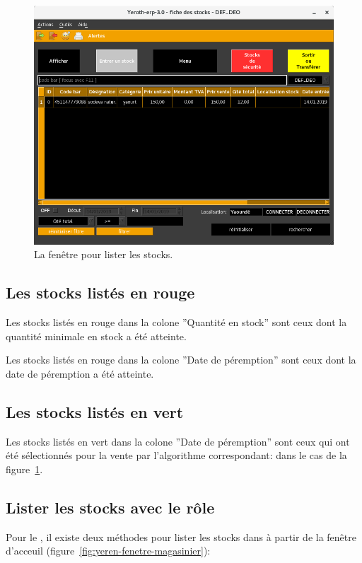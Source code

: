 \begin{figure}[!htbp]
\centering
\includegraphics[scale=0.63]{images/yeren-fenetre-lister.png}
\caption{La fen\^etre pour lister les stocks.}
\label{fig:fenetre-lister}
\end{figure}

\subsection{Les stocks list\'es en rouge}
Les stocks list\'es en \textcolor{firebrickred}{rouge} dans
la colone ''Quantit\'e en stock'' sont ceux dont la quantit\'e
minimale en stock a \'et\'e atteinte.

Les stocks list\'es en \textcolor{firebrickred}{rouge} dans
la colone ''Date de p\'eremption'' sont ceux dont la date de
p\'eremption a \'et\'e atteinte.

\subsection{Les stocks list\'es en vert}
Les stocks list\'es en \textcolor{medgreen}{vert} dans la
colone ''Date de p\'eremption'' sont ceux qui ont \'et\'e
s\'electionn\'es pour la vente par l'algorithme correspondant:
\dpfdpo dans le cas de la figure~\ref{fig:fenetre-lister}.

\subsection{Lister les stocks avec le r\^ole \magasinier}
Pour le \role \magasinier, il existe deux m\'ethodes pour
lister les stocks dans \yeren \`a partir de la fen\^etre
d'acceuil (figure~\ref{fig:yeren-fenetre-magasinier}): 

